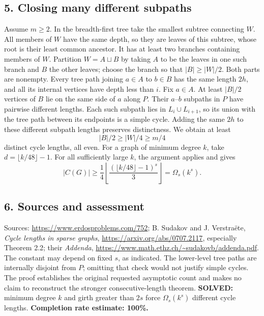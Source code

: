 \subsection*{5. Closing many different subpaths}
Assume $m\ge2$. In the breadth-first tree take the smallest subtree connecting $W$. All members of $W$ have the same depth, so they are leaves of this subtree, whose root is their least common ancestor. It has at least two branches containing members of $W$. Partition $W=A\sqcup B$ by taking $A$ to be the leaves in one such branch and $B$ the other leaves; choose the branch so that $|B|\ge|W|/2$. Both parts are nonempty.
Every tree path joining $a\in A$ to $b\in B$ has the same length $2h$, and all its internal vertices have depth less than $i$. Fix $a\in A$. At least $|B|/2$ vertices of $B$ lie on the same side of $a$ along $P$. Their $a$--$b$ subpaths in $P$ have pairwise different lengths. Each such subpath lies in $L_i\cup L_{i+1}$, so its union with the tree path between its endpoints is a simple cycle. Adding the same $2h$ to these different subpath lengths preserves distinctness. We obtain at least
\[
 |B|/2\ge |W|/4\ge m/4
\]
distinct cycle lengths, all even.
For a graph of minimum degree $k$, take $d=\lfloor k/48\rfloor-1$. For all sufficiently large $k$, the argument applies and gives
\[
 |C(G)|\ge\frac14\left\lfloor\frac{(\lfloor k/48\rfloor-1)^s}{3}\right\rfloor
 =\Omega_s(k^s).
\]
\subsection*{6. Sources and assessment}
Sources: \url{https://www.erdosproblems.com/752}; B. Sudakov and J. Verstra\"ete, \emph{Cycle lengths in sparse graphs}, \url{https://arxiv.org/abs/0707.2117}, especially Theorem 2.2; their \emph{Addenda}, \url{https://www.math.ethz.ch/~sudakovb/addenda.pdf}.
The constant may depend on fixed $s$, as indicated. The lower-level tree paths are internally disjoint from $P$; omitting that check would not justify simple cycles. The proof establishes the original requested asymptotic count and makes no claim to reconstruct the stronger consecutive-length theorem.
\textbf{SOLVED:} minimum degree $k$ and girth greater than $2s$ force $\Omega_s(k^s)$ different cycle lengths.
\textbf{Completion rate estimate: 100\%.}
